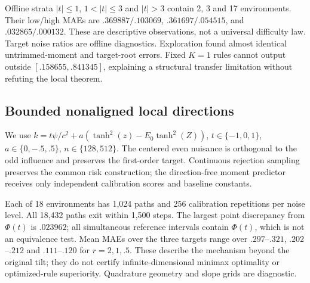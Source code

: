 Offline strata $|t|\le1$, $1<|t|\le3$ and $|t|>3$ contain 2, 3 and 17 environments. Their low/high MAEs are $.369887/.103069$, $.361697/.054515$, and $.032865/.000132$. These are descriptive observations, not a universal difficulty law. Target noise ratios are offline diagnostics. Exploration found almost identical untrimmed-moment and target-root errors. Fixed $K=1$ rules cannot output outside $[.158655,.841345]$, explaining a structural transfer limitation without refuting the local theorem.

\subsection{Bounded nonaligned local directions}
We use $k=t\psi/c^2+a(\tanh^2(z)-E_0\tanh^2(Z))$, $t\in\{-1,0,1\}$, $a\in\{0,-.5,.5\}$, $n\in\{128,512\}$. The centered even nuisance is orthogonal to the odd influence and preserves the first-order target. Continuous rejection sampling preserves the common risk construction; the direction-free moment predictor receives only independent calibration scores and baseline constants.

Each of 18 environments has 1,024 paths and 256 calibration repetitions per noise level. All 18,432 paths exit within 1,500 steps. The largest point discrepancy from $\Phi(t)$ is $.023962$; all simultaneous reference intervals contain $\Phi(t)$, which is not an equivalence test. Mean MAEs over the three targets range over $.297$--$.321$, $.202$--$.212$ and $.111$--$.120$ for $r=2,1,.5$. These describe the mechanism beyond the original tilt; they do not certify infinite-dimensional minimax optimality or optimized-rule superiority. Quadrature geometry and slope grids are diagnostic.
